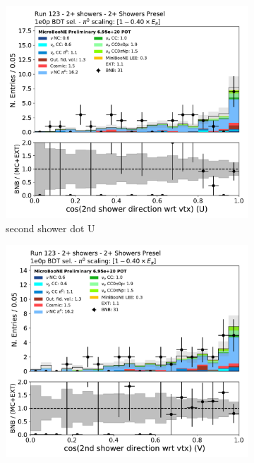 \begin{figure}[H]
    \centering
    \begin{subfigure}{0.3\textwidth}
    \includegraphics[width=1.0\textwidth]{Sidebands/Figures/TwoShr_1e0pSel/BDT/secondshower_U_dot.pdf}
    \caption{second shower dot U}
    \end{subfigure}
    \begin{subfigure}{0.3\textwidth}
    \includegraphics[width=1.0\textwidth]{Sidebands/Figures/TwoShr_1e0pSel/BDT/secondshower_V_dot.pdf}

\end{subfigure}
\end{figure}
